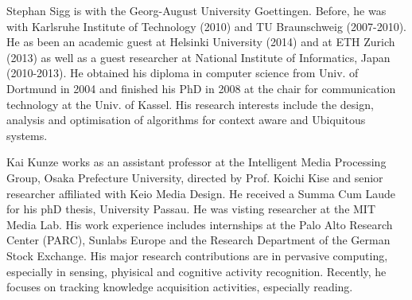 \documentclass[journal]{IEEEtran}
\begin{document}
\begin{figure*}






\begin{IEEEbiography}{Stephan Sigg}
is with the Georg-August University Goettingen.  
Before, he was with Karlsruhe Institute of Technology (2010) and TU Braunschweig (2007-2010).
He as been an academic guest at Helsinki University (2014) and at ETH Zurich (2013) as well as a guest researcher at National Institute of Informatics, Japan (2010-2013).
He obtained his diploma in computer science from Univ. of Dortmund in 2004 and finished his PhD in 2008 at the chair for communication technology at the Univ. of Kassel.
His research interests include the design, analysis and optimisation of algorithms for context aware and Ubiquitous systems.
\end{IEEEbiography}

\begin{IEEEbiography}{Kai Kunze}
works as an assistant professor at the Intelligent Media Processing Group, Osaka Prefecture University, directed by Prof. Koichi Kise and senior researcher affiliated with Keio Media Design. 
He received a Summa Cum Laude for his phD thesis, University Passau. 
He was visting researcher at the MIT Media Lab. 
His work experience includes internships at the Palo Alto Research Center (PARC), Sunlabs Europe and the Research Department of the German Stock Exchange. 
His major research contributions are in pervasive computing, especially in sensing, phyisical and cognitive activity recognition. 
Recently, he focuses on tracking knowledge acquisition activities, especially reading.
\end{IEEEbiography}


\end{figure*}
\end{document}

